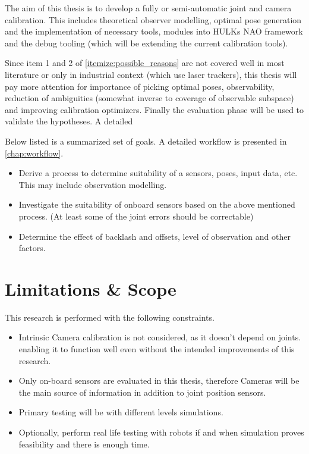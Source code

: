 \documentclass[english, printversion, nomenclature, notitle]{tuvisionthesis} %
\begin{document}
The aim of this thesis is to develop a fully or semi-automatic joint and camera calibration. This includes theoretical observer modelling, optimal  pose generation and the implementation of necessary tools, modules into HULKs NAO framework and the debug tooling (which will be extending the current calibration tools).

Since item 1 and 2 of \cref{itemize:possible_reasons} are not covered well in most literature or only in industrial context (which use laser trackers), this thesis will pay more attention for importance of picking optimal poses, observability, reduction of ambiguities (somewhat inverse to coverage of observable subspace)  and improving calibration optimizers. Finally the evaluation phase will be used to validate the hypotheses. A detailed 

Below listed is a summarized set of goals. A detailed workflow is presented in \cref{chap:workflow}.

\begin{itemize}
	\item Derive a process to determine suitability of a sensors, poses, input data, etc. This may include observation modelling.
	\item Investigate the suitability of onboard sensors based on the above mentioned process. (At least some of the joint errors should be correctable)
	\item Determine the effect of backlash and offsets, level of observation and other factors.
\end{itemize}

\section{Limitations \& Scope}

This research is performed with the following constraints.

\begin{itemize}
	\item Intrinsic Camera calibration is not considered, as it doesn't depend on joints. enabling it to function well even without the intended improvements of this research.
	\item Only on-board sensors are evaluated in this thesis, therefore Cameras will be the main source of information in addition to joint position sensors.
	\item Primary testing will be with different levels simulations.
	\item Optionally, perform real life testing with robots if and when simulation proves feasibility and there is enough time.
\end{itemize}
\end{document}
